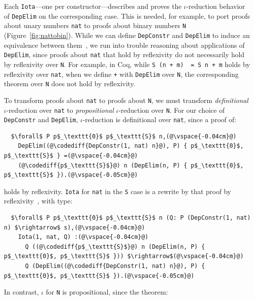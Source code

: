 Each \lstinline{Iota}---one per constructor---describes and proves the $\iota$-reduction behavior
of \lstinline{DepElim} on the corresponding case.
This is needed, for example, to port proofs about unary numbers \lstinline{nat} to
proofs about binary numbers \lstinline{N} (Figure~\ref{fig:nattobin}).
While we can define \lstinline{DepConstr} and \lstinline{DepElim} to induce an equivalence
between them~\href{https://github.com/uwplse/pumpkin-pi/blob/v2.0.0/plugin/coq/nonorn.v}{}, %
we run into trouble reasoning about applications of \lstinline{DepElim},
since proofs about \lstinline{nat} that hold by reflexivity do not necessarily hold by reflexivity over \lstinline{N}. 
For example, in Coq, while \lstinline{S (n + m)  = S n + m} holds by reflexivity over \lstinline{nat},
when we define \lstinline{+} with \lstinline{DepElim} over \lstinline{N},
the corresponding theorem over \lstinline{N} does not hold by reflexivity.

To transform proofs about \lstinline{nat} to proofs about \lstinline{N}, we must transform \textit{definitional} $\iota$-reduction over \lstinline{nat} to \textit{propositional} $\iota$-reduction over \lstinline{N}.
For our choice of \lstinline{DepConstr} and \lstinline{DepElim},
$\iota$-reduction is definitional over \lstinline{nat}, since a proof of:

\begin{lstlisting}
  $\forall$ P p$_\texttt{0}$ p$_\texttt{S}$ n,(@\vspace{-0.04cm}@)
    DepElim((@\codediff{DepConstr(1, nat) n}@), P) { p$_\texttt{0}$, p$_\texttt{S}$ } =(@\vspace{-0.04cm}@)
    (@\codediff{p$_\texttt{S}$}@) n (DepElim(n, P) { p$_\texttt{0}$, p$_\texttt{S}$ }).(@\vspace{-0.05cm}@)
\end{lstlisting}
holds by reflexivity.
\lstinline{Iota} for \lstinline{nat} in the \lstinline{S} case is a rewrite by that proof by reflexivity~\href{https://github.com/uwplse/pumpkin-pi/blob/v2.0.0/plugin/coq/nonorn.v}{},
with type:

\begin{lstlisting}
  $\forall$ P p$_\texttt{0}$ p$_\texttt{S}$ n (Q: P (DepConstr(1, nat) n) $\rightarrow$ s),(@\vspace{-0.04cm}@)
    Iota(1, nat, Q) :(@\vspace{-0.04cm}@)
      Q ((@\codediff{p$_\texttt{S}$}@) n (DepElim(n, P) { p$_\texttt{0}$, p$_\texttt{S}$ })) $\rightarrow$(@\vspace{-0.04cm}@)
      Q (DepElim((@\codediff{DepConstr(1, nat) n}@), P) { p$_\texttt{0}$, p$_\texttt{S}$ }).(@\vspace{-0.05cm}@)
\end{lstlisting}
In contrast, $\iota$ for \lstinline{N} is propositional, since the 
theorem: %

